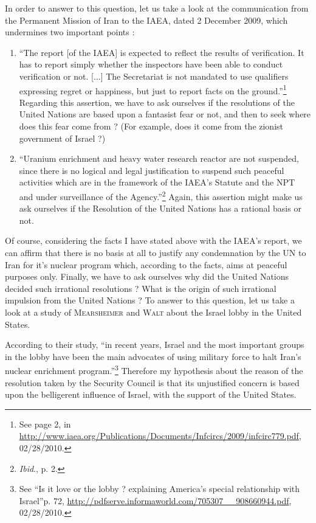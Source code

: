 \documentclass[
paper=a4,
fontsize=10pt,
headsepline,
headings=normal,
version=last,
footinclude=true,
mpinclude=true,
fleqn
]{scrartcl}
\begin{document}
In order to answer to this question, let us take a look at the communication from the Permanent Mission of Iran to the IAEA, dated 2 December 2009, which undermines two important points : 
\begin{enumerate}
\item
\textquotedblleft The report [of the IAEA] is expected to reflect the results of verification. It has to report simply whether the inspectors have been able to conduct verification or not. [...] The Secretariat is not mandated to use qualifiers expressing regret or happiness, but just to report facts on the ground.\textquotedblright\footnote{See page 2, in \url{http://www.iaea.org/Publications/Documents/Infcircs/2009/infcirc779.pdf}, 02/28/2010.} Regarding this assertion, we have to ask ourselves if the resolutions of the United Nations are based upon a fantasist fear or not, and then to seek where does this fear come from ? (For example, does it come from the zionist government of Israel ?)
\item
\textquotedblleft Uranium enrichment and heavy water research reactor are not suspended, since there is no logical and legal justification to suspend such peaceful activities which are in the framework of the IAEA's Statute and the NPT and under surveillance of the Agency.\textquotedblright\footnote{\emph{Ibid}., p. 2.} Again, this assertion might make us ask ourselves if the Resolution of the United Nations has a rational basis or not.
\end{enumerate}

Of course, considering the facts I have stated above with the IAEA's report, we can affirm that there is no basis at all to justify any condemnation by the UN to Iran for it's nuclear program which, according to the facts, aims at peaceful purposes only. Finally, we have to ask ourselves why did the United Nations decided such irrational resolutions ? What is the origin of such irrational impulsion from the United Nations ? To answer to this question, let us take a look at a study of \textsc{Mearsheimer} and \textsc{Walt} about the Israel lobby in the United States.

According to their study, \textquotedblleft in recent years, Israel and the most important groups in the lobby have been the main advocates of using military force to halt Iran's nuclear enrichment program.\textquotedblright\footnote{See \textquotedblleft Is it love or the lobby ? explaining America's special relationship with Israel\textquotedblright p. 72, \url{http://pdfserve.informaworld.com/705307__908660944.pdf}, 02/28/2010.} Therefore my hypothesis about the reason of the resolution taken by the Security Council is that its unjustified concern is based upon the belligerent influence of Israel, with the support of the United States.
\end{document}
